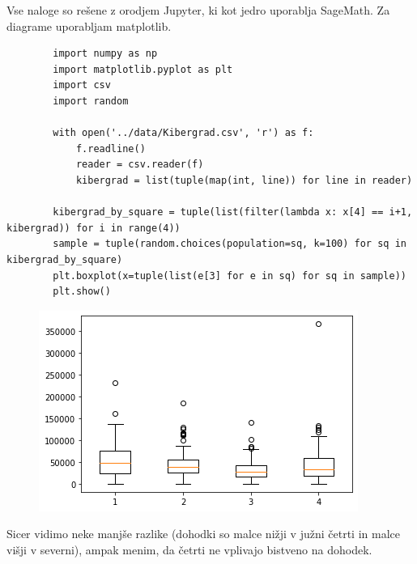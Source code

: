 \documentclass[a4paper]{article}
\begin{document}
\maketitle

\pagebreak

Vse naloge so rešene z orodjem Jupyter, ki kot jedro uporablja SageMath.
Za diagrame uporabljam matplotlib.

\begin{homeworkProblem}
    \solution
    \begin{verbatim}
        import numpy as np
        import matplotlib.pyplot as plt
        import csv
        import random

        with open('../data/Kibergrad.csv', 'r') as f:
            f.readline()
            reader = csv.reader(f)
            kibergrad = list(tuple(map(int, line)) for line in reader)

        kibergrad_by_square = tuple(list(filter(lambda x: x[4] == i+1, kibergrad)) for i in range(4))
        sample = tuple(random.choices(population=sq, k=100) for sq in kibergrad_by_square)
        plt.boxplot(x=tuple(list(e[3] for e in sq) for sq in sample))
        plt.show()
    \end{verbatim}
    \begin{figure}[h!]
        \includegraphics{fig-1-1.png}
    \end{figure}

    Sicer vidimo neke manjše razlike (dohodki so malce nižji v južni četrti in malce višji v severni), ampak menim, da četrti ne vplivajo bistveno na dohodek.


\end{homeworkProblem}
\end{document}
